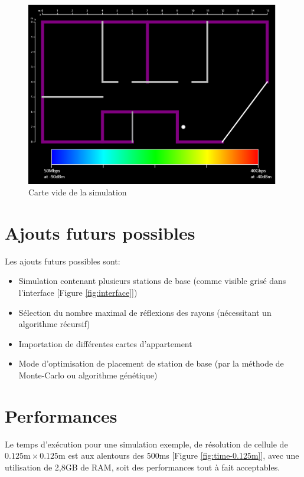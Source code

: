 \begin{figure}[H]
    \centering
    \includegraphics[width=\textwidth]{latex/images/blank_map.png}
    \caption{Carte vide de la simulation}
    \label{fig:blank-map}
\end{figure}

\section{Ajouts futurs possibles}
Les ajouts futurs possibles sont:
\begin{itemize}
    \item Simulation contenant plusieurs stations de base (comme visible grisé dans l'interface [Figure \ref{fig:interface}])
    \item Sélection du nombre maximal de réflexions des rayons (nécessitant un algorithme récursif)
    \item Importation de différentes cartes d'appartement
    \item Mode d'optimisation de placement de station de base (par la méthode de Monte-Carlo ou algorithme génétique)
\end{itemize}

\section{Performances}
Le temps d'exécution pour une simulation exemple, de résolution de cellule de $0.125\mathrm{m}\times0.125\mathrm{m}$ est aux alentours des 500ms [Figure \ref{fig:time-0.125m}], avec une utilisation de 2,8GB de RAM, soit des performances tout à fait acceptables.


